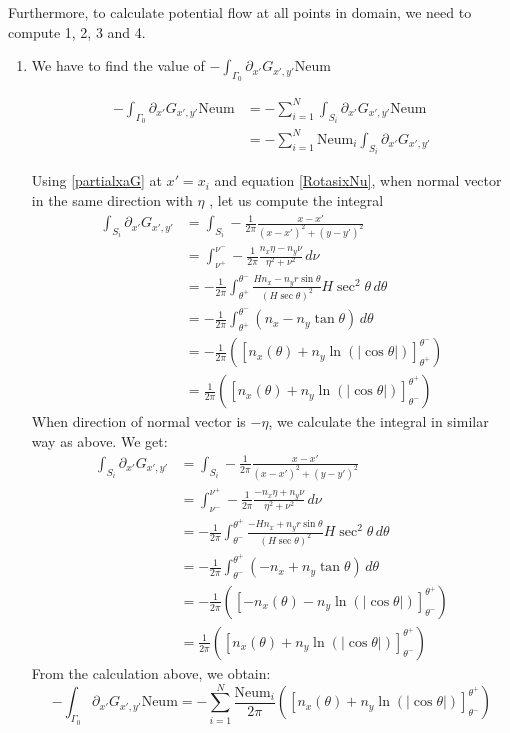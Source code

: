 \documentclass[a4paper,12pt]{article}
\newcommand{\integ}[3]{%
\ensuremath{\displaystyle{\int^{#2}_{#1} #3}}}
\begin{document}
Furthermore, to calculate potential flow at all points in domain, we need to compute 1, 2, 3 and 4.
\begin{enumerate}
 \item We have to find the value of $-\integ{\Gamma_0}{}{\partial_{x'} G_{x',y'} \text{Neum}}$

 \begin{align}
  -\integ{\Gamma_0}{}{\partial_{x'} G_{x',y'} \text{Neum}}&=-\sum\limits_{i=1}^N  \integ{S_i}{}{\partial_{x'} G_{x',y'} \text{Neum}}\\
  &=-\sum\limits_{i=1}^N \text{Neum}_i \integ{S_i}{}{\partial_{x'} G_{x',y'}}
 \end{align}

Using \eqref{partialxaG} at $x'=x_i$ and equation \eqref{RotasixNu}, when normal vector in the same direction with $\eta$ , let us compute the integral
\begin{align}
 \integ{S_i}{}{\partial_{x'} G_{x',y'}} &= \integ{S_i}{}{-\frac{1}{2\pi}\frac{x-x'}{(x-x')^2+(y-y')^2}}\\
 &=\integ{\nu^+}{\nu^-}{-\frac{1}{2\pi} \frac{n_x\eta-n_y \nu}{\eta^2+\nu^2} \, d\nu}\\
 &=-\frac{1}{2\pi} \integ{\theta^+}{\theta^-}{\frac{H n_x-n_y r \sin\theta}{\left( H\sec\theta\right)^2 }H \sec^2\theta \, d\theta}\\
&=-\frac{1}{2\pi} \integ{\theta^+}{\theta^-}{(n_x-n_y\tan\theta) \, d\theta}\\
&=-\frac{1}{2\pi} \left(\left[ n_x(\theta) + n_y \ln(\vert \cos\theta\vert )\right]_{\theta^+}^{\theta^-} \right)\\
&= \frac{1}{2\pi} \left(\left[ n_x(\theta) + n_y \ln(\vert \cos\theta\vert )\right]_{\theta^-}^{\theta^+} \right)\label{intPartialxaG} 
\end{align}
When direction of normal vector is $-\eta$, we calculate the integral in similar way as above. We get:
\begin{align}
 \integ{S_i}{}{\partial_{x'} G_{x',y'}} &= \integ{S_i}{}{-\frac{1}{2\pi}\frac{x-x'}{(x-x')^2+(y-y')^2}}\\
 &=\integ{\nu^-}{\nu^+}{-\frac{1}{2\pi} \frac{-n_x\eta+n_y \nu}{\eta^2+\nu^2} \, d\nu}\\
 &=-\frac{1}{2\pi} \integ{\theta^-}{\theta^+}{\frac{-H n_x+n_y r \sin\theta}{\left( H\sec\theta\right)^2 }H \sec^2\theta \, d\theta}\\
&=-\frac{1}{2\pi} \integ{\theta^-}{\theta^+}{(-n_x+n_y\tan\theta) \, d\theta}\\
&= -\frac{1}{2\pi} \left(\left[ -n_x(\theta) - n_y \ln(\vert \cos\theta\vert )\right]_{\theta^-}^{\theta^+} \right)\\
&= \frac{1}{2\pi} \left(\left[ n_x(\theta) + n_y \ln(\vert \cos\theta\vert )\right]_{\theta^-}^{\theta^+} \right)
\end{align}
From the calculation above, we obtain:
\begin{equation}
 -\integ{\Gamma_0}{}{\partial_{x'} G_{x',y'} \text{Neum}}=-\sum\limits_{i=1}^N \frac{\text{Neum}_i}{2\pi} \left( \left[ n_x(\theta) + n_y \ln(\vert \cos\theta\vert )\right]_{\theta^-}^{\theta^+} \right) 
\end{equation}


\end{enumerate}
\end{document}
